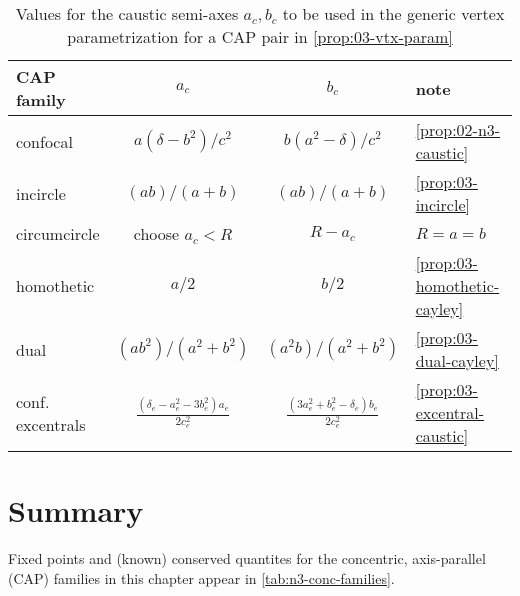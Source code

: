 \begin{table}
\centering
\begin{tabular}{|l|c|c|l|}
\hline
CAP family        & $a_c$ & $b_c$ & note \\
\hline
confocal     & ${a\left(\delta-{b}^{2}\right)}/{c^2}$ & ${b\left({a}^{2}-\delta\right)}/{c^2}$ & \cref{prop:02-n3-caustic}  \\
\hline
incircle  & $(a b)/(a+b)$  & $(a b)/(a+b)$  & \cref{prop:03-incircle}  \\
\hline
circumcircle & choose $a_c<R$ & $R-a_c$ & $R=a=b$     \\
\hline
homothetic   &  $a/2$ & $b/2$ &  \cref{prop:03-homothetic-cayley}    \\
\hline
dual & $(a b^2)/(a^2+b^2)$  & $(a^2 b)/(a^2+b^2)$   &  \cref{prop:03-dual-cayley}    \\
\hline
\makecell[lc]{conf.\\excentrals} & $\frac{(\delta_e- a_e^2 - 3b_e^2) a_e}{2 c_e^2}$ & $\frac{(3a_e^2 + b_e^2 - \delta_e)b_e}{2 c_e^2}$   & \cref{prop:03-excentral-caustic}\\
\hline
\end{tabular}
\caption{Values for the caustic semi-axes $a_c,b_c$ to be used in the generic vertex parametrization for a CAP pair in \cref{prop:03-vtx-param}}
\label{tab:03-cap-vtx}
\end{table}

\section{Summary}

Fixed points and (known) conserved quantites for the concentric, axis-parallel (CAP) families in this chapter appear in
\cref{tab:n3-conc-families}. 

